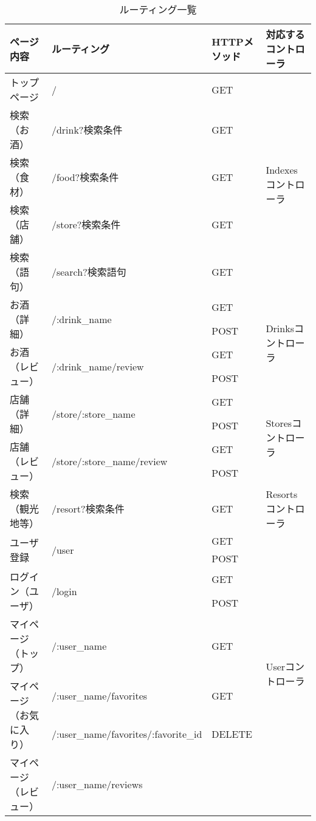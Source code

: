 \documentclass[a4j,titlepage]{jarticle}
\begin{document}
\begin{table}[!htbp]
\caption{ルーティング一覧}
\label{routing}
\small
\begin{center}
\begin{tabular}{|l|l|l|p{4cm}|}\hline
ページ内容 & ルーティング & HTTPメソッド & 対応するコントローラ\\\hline\hline
トップページ & / & GET & \multirow{5}{*}{Indexesコントローラ} \\\cline{1-3}
検索（お酒） & /drink?検索条件 & GET & \\\cline{1-3}
検索（食材） & /food?検索条件 & GET & \\\cline{1-3}
検索（店舗） & /store?検索条件 & GET &  \\\cline{1-3}
検索（語句） & /search?検索語句 & GET & \\\hline
\multirow{2}{*}{お酒（詳細）} & \multirow{2}{*}{/:drink\_name}
& GET & \multirow{4}{*}{Drinksコントローラ} \\\cline{3-3}
 & & POST &  \\\cline{1-3}
\multirow{2}{*}{お酒（レビュー）} & \multirow{2}{*}{/:drink\_name/review}
& GET & \\\cline{3-3}
 & & POST & \\\hline
\multirow{2}{*}{店舗（詳細）} & \multirow{2}{*}{/store/:store\_name}
& GET & \multirow{4}{*}{Storesコントローラ} \\\cline{3-3}
 & & POST &  \\\cline{1-3}
\multirow{2}{*}{店舗（レビュー）}& \multirow{2}{*}{/store/:store\_name/review}
& GET &  \\\cline{3-3}
 & & POST &\\\hline
検索（観光地等） & /resort?検索条件 & GET & Resortsコントローラ \\\hline
\multirow{2}{*}{ユーザ登録} & \multirow{2}{*}{/user}
& GET & \multirow{12}{*}{Userコントローラ} \\\cline{3-3}
 & & POST & \\\cline{1-3}
 \multirow{2}{*}{ログイン（ユーザ）} & \multirow{2}{*}{/login}
 & GET & \\\cline{3-3}
 & & POST & \\\cline{1-3}
マイページ（トップ） & /:user\_name
& GET & \\\cline{1-3}
\multirow{2}{*}{マイページ（お気に入り）} & /:user\_name/favorites
& GET & \\\cline{2-3}
 & /:user\_name/favorites/:favorite\_id & DELETE & \\\cline{1-3}
\multirow{2}{*}{マイページ（レビュー）} & /:user\_name/reviews

\end{tabular}
\end{center}
\end{table}
\end{document}
